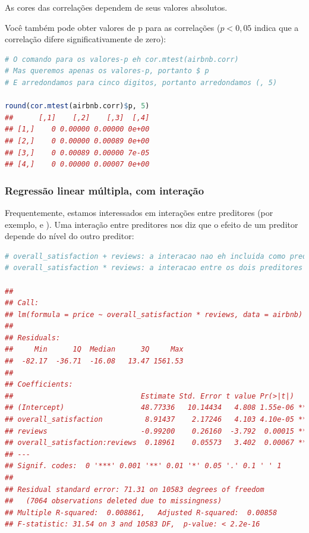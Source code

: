 \documentclass{article}
\begin{document}
As cores das correlações dependem de seus valores absolutos.

Você também pode obter valores de p para as correlações ($p <0,05$ indica que a correlação difere significativamente de zero):

\begin{lstlisting}[language=R]
# O comando para os valores-p eh cor.mtest(airbnb.corr)
# Mas queremos apenas os valores-p, portanto $ p
# E arredondamos para cinco digitos, portanto arredondamos (, 5)

round(cor.mtest(airbnb.corr)$p, 5) 
##      [,1]    [,2]    [,3]  [,4]
## [1,]    0 0.00000 0.00000 0e+00
## [2,]    0 0.00000 0.00089 0e+00
## [3,]    0 0.00089 0.00000 7e-05
## [4,]    0 0.00000 0.00007 0e+00
\end{lstlisting}

\newpage

\subsubsection{Regressão linear múltipla, com interação}

Frequentemente, estamos interessados em interações entre preditores (por exemplo,  e ). Uma interação entre preditores nos diz que o efeito de um preditor depende do nível do outro preditor:

\begin{lstlisting}[language=R]
# overall_satisfaction + reviews: a interacao nao eh incluida como preditor
# overall_satisfaction * reviews: a interacao entre os dois preditores eh incluida como preditora

## 
## Call:
## lm(formula = price ~ overall_satisfaction * reviews, data = airbnb)
## 
## Residuals:
##     Min      1Q  Median      3Q     Max 
##  -82.17  -36.71  -16.08   13.47 1561.53 
## 
## Coefficients:
##                              Estimate Std. Error t value Pr(>|t|)    
## (Intercept)                  48.77336   10.14434   4.808 1.55e-06 ***
## overall_satisfaction          8.91437    2.17246   4.103 4.10e-05 ***
## reviews                      -0.99200    0.26160  -3.792  0.00015 ***
## overall_satisfaction:reviews  0.18961    0.05573   3.402  0.00067 ***
## ---
## Signif. codes:  0 '***' 0.001 '**' 0.01 '*' 0.05 '.' 0.1 ' ' 1
## 
## Residual standard error: 71.31 on 10583 degrees of freedom
##   (7064 observations deleted due to missingness)
## Multiple R-squared:  0.008861,   Adjusted R-squared:  0.00858 
## F-statistic: 31.54 on 3 and 10583 DF,  p-value: < 2.2e-16

\end{lstlisting}
\end{document}
